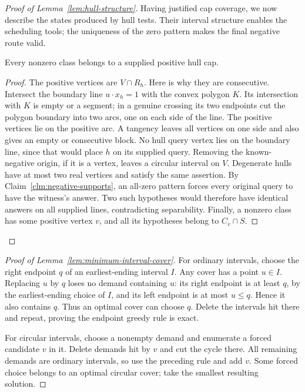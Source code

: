 \begin{proof}[Proof of Lemma~\ref{lem:hull-structure}]
Having justified cap coverage, we now describe the states produced
by hull tests. Their interval structure enables the scheduling tools;
the uniqueness of the zero pattern makes the final negative route valid.

\begin{claim}
\label{clm:circular-patterns}
Every nonzero class belongs to a supplied positive hull cap.
\end{claim}
\begin{proof}
The positive vertices are $V\cap R_h$.
Here is why they are consecutive. Intersect the boundary line
$u\cdot x_h=1$ with the convex polygon $K$. Its intersection with
$K$ is empty or a segment; in a genuine crossing its two endpoints
cut the polygon boundary into two arcs, one on each side of the line.
The positive vertices lie on the positive arc. A tangency leaves
all vertices on one side and also gives an empty or consecutive block.
No hull query vertex lies on the boundary line, since that would
place $h$ on its supplied query. Removing the known-negative origin, if it is a vertex,
leaves a circular interval on $V$. Degenerate hulls have at most
two real vertices and satisfy the same assertion.
By Claim~\ref{clm:negative-supports}, an all-zero pattern forces
every original query to have the witness's answer. Two such
hypotheses would therefore have identical answers on all supplied
lines, contradicting separability.
Finally, a nonzero class has some positive vertex $v$, and all
its hypotheses belong to $C_v\cap S$.
\end{proof}
\end{proof}

\begin{proof}[Proof of Lemma~\ref{lem:minimum-interval-cover}]
For ordinary intervals, choose the right endpoint $q$ of an
earliest-ending interval $I$. Any cover has a point $u\in I$.
Replacing $u$ by $q$ loses no demand containing $u$: its right
endpoint is at least $q$, by the earliest-ending choice of $I$,
and its left endpoint is at most $u\le q$. Hence it also contains
$q$.
Thus an optimal cover can choose $q$. Delete the intervals hit
there and repeat, proving the endpoint greedy rule is exact.

For circular intervals, choose a nonempty demand and enumerate
a forced candidate $v$ in it. Delete demands hit by $v$ and cut
the cycle there. All remaining demands are ordinary intervals,
so use the preceding rule and add $v$. Some forced choice belongs
to an optimal circular cover; take the smallest resulting solution.
\end{proof}

